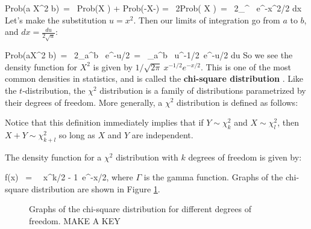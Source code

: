\bel
\textrm{Prob}(a \leq X^2 \leq b)\ = \ \textrm{Prob}(\leq X \leq {}) + \textrm{Prob}(-\leq X\leq -)
\eel
\bel = \ 2\cdot\textrm{Prob}( \leq X \leq {})\ = \ 2\int_{}^{} \ e^{-x^2/2} dx
\eel
Let's make the substitution $u = x^2$.  Then our limits of integration go from $a$ to $b$, and $dx = \frac{du}{2\sqrt{u}}$:

\bel
\textrm{Prob}(a\leq X^2 \leq b)\ = \ 2\int_{a}^{b} \ e^{-u/2}\ = \ \int_{a}^{b} \ u^{-1/2}\ e^{-u/2} du
\eel
So we see the density function for $X^2$ is given by $1/\sqrt{2\pi}\ x^{-1/2}e^{-x/2}$.  This is one of the most common densities in statistics, and is called the \textbf{chi-square distribution} .  Like the $t$-distribution, the $\chi^2$ distribution is a family of distributions parametrized by their degrees of freedom.  More generally, a $\chi^2$ distribution is defined as follows:

\begin{table}[h]
\begin{center}
\end{center}
\end{table}
Notice that this definition immediately implies that if $Y \sim \chi^2_k$ and $X \sim \chi^2_l$, then $X + Y \sim \chi^2_{k+l}$ so long as $X$ and $Y$ are independent.

The density function for a $\chi^2$  distribution with $k$ degrees of freedom is given by:

\bel
f(x) \ = \  \ x^{k/2 - 1}\ e^{-x/2},
\eel
where $\Gamma$ is the gamma function.  Graphs of the chi-square distribution are shown in Figure \ref{fig:chisquaredist}.

\begin{figure}
\begin{center}
\caption{\label{fig:chisquaredist} Graphs of the chi-square distribution for different degrees of freedom.  MAKE A KEY}
\end{center}\end{figure}

